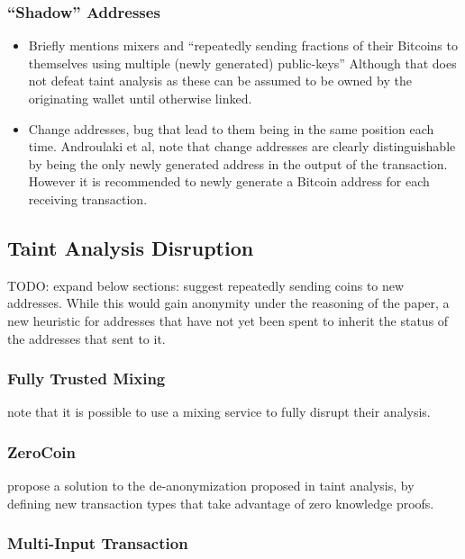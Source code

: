\subsubsection{``Shadow'' Addresses}


\begin{itemize} \item Briefly mentions mixers and ``repeatedly sending fractions
        of their Bitcoins to themselves using multiple (newly generated)
    public-keys'' Although that does not defeat taint analysis as these can be
assumed to be owned by the originating wallet until otherwise linked.  \item
    Change addresses, bug that lead to them being in the same position each
    time.  Androulaki et al, note that change addresses are clearly
    distinguishable by being the only newly generated address in the output of
    the transaction.  However it is recommended to newly generate a Bitcoin
    address for each receiving transaction.  \end{itemize}


\subsection{Taint Analysis Disruption}
TODO: expand below sections:
\textcite{reid-anon} suggest repeatedly sending coins to new addresses. While this would gain anonymity under the reasoning of the paper, a new heuristic for addresses that have not yet been spent to inherit the status of the addresses that sent to it.


\subsubsection{Fully Trusted Mixing}
\textcite{eval-priv} note that it is possible to use a mixing service to fully disrupt their analysis.


\subsubsection{ZeroCoin} \textcite{zerocoin} propose a solution to the de-anonymization proposed in taint analysis, by defining new transaction types that take advantage of zero knowledge proofs.

\subsubsection{Multi-Input Transaction}

